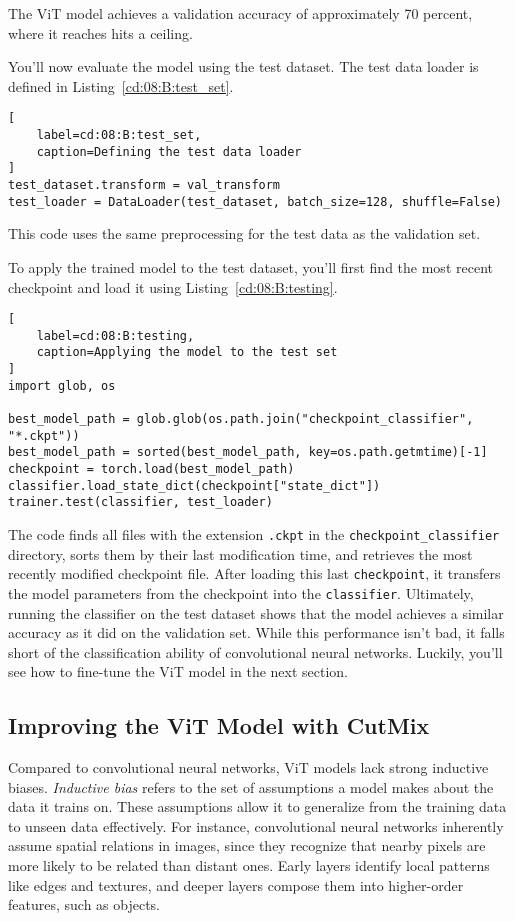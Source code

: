 The ViT model achieves a validation accuracy of approximately 70 percent, where it reaches hits a ceiling.


You'll now evaluate the model using the test dataset. The test data loader is defined in Listing~\ref{cd:08:B:test_set}.
\begin{lstlisting}[
    label=cd:08:B:test_set,
    caption=Defining the test data loader
]
test_dataset.transform = val_transform
test_loader = DataLoader(test_dataset, batch_size=128, shuffle=False)
\end{lstlisting}
This code uses the same preprocessing for the test data as the validation set. 

To apply the trained model to the test dataset, you'll first find the most recent checkpoint and load it using Listing~\ref{cd:08:B:testing}.
\begin{lstlisting}[
    label=cd:08:B:testing,
    caption=Applying the model to the test set
]
import glob, os

best_model_path = glob.glob(os.path.join("checkpoint_classifier", "*.ckpt"))
best_model_path = sorted(best_model_path, key=os.path.getmtime)[-1]
checkpoint = torch.load(best_model_path)
classifier.load_state_dict(checkpoint["state_dict"])
trainer.test(classifier, test_loader)
\end{lstlisting}
The code finds all files with the extension \lstinline{.ckpt} in the \lstinline{checkpoint_classifier} directory, sorts them  by their last modification time, and retrieves the most recently modified checkpoint file. After loading this last \lstinline{checkpoint}, it transfers the model parameters from the checkpoint into the \lstinline{classifier}.
Ultimately, running the classifier on the test dataset shows that the model achieves a similar accuracy as it did on the validation set. 
While this performance isn't bad, it falls short of the classification ability of convolutional neural networks.
Luckily, you'll see how to fine-tune the ViT model in the next section.

\subsection{Improving the ViT Model with CutMix}

Compared to convolutional neural networks, ViT models lack strong inductive biases. \emph{Inductive bias} refers to the set of assumptions a model makes about the data it trains on. These assumptions allow it to generalize from the training data to unseen data effectively. For instance, convolutional neural networks inherently assume spatial relations in images, since they recognize that nearby pixels are more likely to be related than distant ones. Early layers identify local patterns like edges and textures,  and deeper layers compose them into higher-order features, such as objects. 

